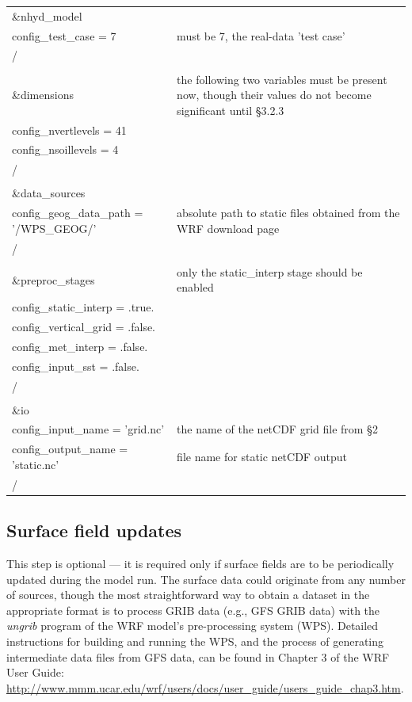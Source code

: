 \documentclass[11pt]{report}
\begin{document}
\begin{longtable}{p{3.0in} |p{3.25in}}

\&nhyd\_model\\
   config\_test\_case       = 7                      & must be 7, the real-data 'test case' \\
/\\
\\
\&dimensions                                         & the following two variables must be present now, though their values do not become significant until \S 3.2.3 \\
   config\_nvertlevels     = 41                      &  \\
   config\_nsoillevels     = 4                       &  \\
/\\
\\
\&data\_sources\\
   config\_geog\_data\_path  = '/WPS\_GEOG/'         & absolute path to static files obtained from the WRF download page\\
/\\
\\
\&preproc\_stages                                    & only the static\_interp stage should be enabled \\
   config\_static\_interp   = .true.                 & \\
   config\_vertical\_grid   = .false.                & \\
   config\_met\_interp      = .false.                & \\
   config\_input\_sst       = .false.                & \\
/\\
\\
\&io\\
   config\_input\_name         = 'grid.nc'           & the name of the netCDF grid file from \S 2 \\
   config\_output\_name        = 'static.nc'         & file name for static netCDF output \\
/\\

\end{longtable}


\subsection{Surface field updates}

This step is optional --- it is required only if surface fields are to be periodically updated during the model run.  The surface data could originate from any number of sources, though the most straightforward way to obtain a dataset in the appropriate format is to process GRIB data (e.g., GFS GRIB data) with the {\em ungrib} program of the WRF model's pre-processing system (WPS).  Detailed instructions for building and running the WPS, and the process of generating intermediate data files from GFS data, can be found in Chapter 3 of the WRF User Guide: \url{http://www.mmm.ucar.edu/wrf/users/docs/user\_guide/users\_guide\_chap3.htm}.
\end{document}
